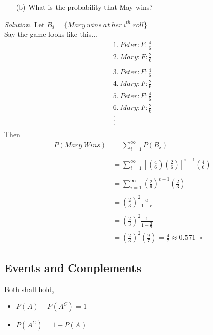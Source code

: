 \documentclass[12pt]{book}
\begin{document}
\begin{itemize}\item [(b)] What is the probability that May wins?\end{itemize}
\textit{Solution. }
Let $B_i=\{Mary~wins~at~her~i^{th}~roll\}$\\
Say the game looks like this...\\
$$\begin{aligned}
1.~Peter : F : \frac{4}{6}\\
2.~Mary : F : \frac{2}{6}\\
\end{aligned} $$
$$\begin{aligned}
3.~Peter : F : \frac{4}{6}\\
4.~Mary : F : \frac{2}{6}\\
5.~Peter : F : \frac{4}{6}\\
6.~Mary : F : \frac{2}{6}\\
.\\
.\\
.\\
\end{aligned} $$
Then 
$$
\begin{aligned}
P(Mary~Wins)&=\sum\limits_{i=1}^{\infty} P(B_{i})\\\\
&= \sum\limits_{i=1}^{\infty} \left[ \left(\frac{4}{6}\right) \left(\frac{2}{6}\right) \right]^{i-1} \left(\frac{4}{6}\right)\\\\
&=\sum\limits_{i=1}^{\infty} \left(\frac{2}{9}\right)^{i-1} \left(\frac{2}{3}\right)\\\\
&= \left(\frac{2}{3}\right)^{2} \frac{a}{1-r}\\\\
&=\left(\frac{2}{3}\right)^{2} \frac{1}{1-\frac{2}{9}}\\
&=\left(\frac{2}{3}\right)^{2} \left(\frac{9}{7}\right) = \frac{4}{7} \approx 0.571~~~\square
\end{aligned}
$$




\newpage
\subsection{Events and Complements}
Both shall hold, 
\begin{itemize}
\item $P(A)+P(A^C)=1$
\item $P(A^C)=1-P(A)$
\end{itemize}
\end{document}
